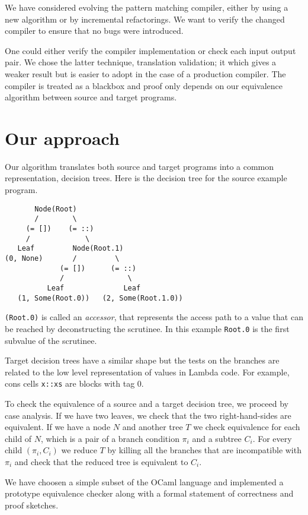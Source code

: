 \documentclass[12pt]{article}
\begin{document}
We have considered evolving the pattern matching compiler, either by
using a new algorithm or by incremental refactorings.
We want to verify the changed compiler to ensure that no bugs were
introduced.

One could either verify the compiler implementation or check each
input output pair. We chose the latter technique, translation
validation; it which gives a weaker result but is easier to adopt in
the case of a production compiler. The compiler is treated as a
blackbox and proof only depends on our equivalence algorithm between
source and target programs.

\section{Our approach}
Our algorithm translates both source and target programs into a common
representation, decision trees. Here is the decision tree for the
source example program.
\begin{verbatim}
       Node(Root)
       /        \
     (= [])    (= ::)
     /             \
   Leaf         Node(Root.1)
(0, None)       /         \
             (= [])      (= ::)
             /               \
          Leaf              Leaf
   (1, Some(Root.0))   (2, Some(Root.1.0))
\end{verbatim}
\texttt{(Root.0)} is called an \emph{accessor}, that represents the
access path to a value that can be reached by deconstructing the
scrutinee. In this example \texttt{Root.0} is the first subvalue of the scrutinee.

Target decision trees have a similar shape but the tests on the
branches are related to the low level representation of values in
Lambda code. For example, cons cells \texttt{x::xs} are blocks with
tag 0.

To check the equivalence of a source and a target decision tree,
we proceed by case analysis.
If we have two leaves, we check that the two right-hand-sides are
equivalent.
If we have a node $N$ and another tree $T$ we check equivalence for
each child of $N$, which is a pair of a branch condition $\pi_i$ and a
subtree $C_i$. For every child $(\pi_i, C_i)$ we reduce $T$ by killing all
the branches that are incompatible with $\pi_i$ and check that the
reduced tree is equivalent to $C_i$.

We have choosen a simple subset of the OCaml language and implemented a
prototype equivalence checker along with a formal statement of
correctness and proof sketches.
\end{document}
